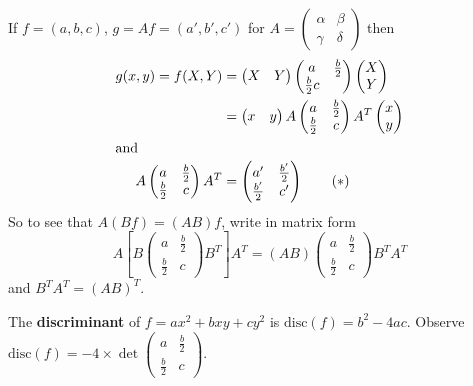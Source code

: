 \documentclass{article}
\begin{document}
\begin{remark}
    If $f = (a,b,c)$, $g = Af = (a',b',c')$ for $A = \begin{pmatrix} \alpha & \beta \\ \gamma & \delta \end{pmatrix}$ then
    \begin{align*}
    g(x,y) = f(X,Y) &= \begin{pmatrix}X & Y\end{pmatrix}\begin{pmatrix}a & \frac{b}{2} \\ \frac{b}{2} c \end{pmatrix}\begin{pmatrix}X \\ Y\end{pmatrix} \\
                    &= \begin{pmatrix}x & y\end{pmatrix}A\begin{pmatrix}a & \frac{b}{2} \\ \frac{b}{2} & c \end{pmatrix}A^T \begin{pmatrix}x \\ y\end{pmatrix} \\
        \shortintertext{and}
                    A\begin{pmatrix}a & \frac{b}{2} \\ \frac{b}{2} & c \end{pmatrix}A^T&= \begin{pmatrix} a' & \frac{b'}{2} \\ \frac{b'}{2} & c' \end{pmatrix} \label{eq:9star}\tag{$*$}
    \end{align*}
    So to see that $A(Bf) = (AB)f$, write in matrix form
    \begin{equation*}
    A[B \begin{pmatrix}a & \frac{b}{2}\\\frac{b}{2} & c\end{pmatrix} B^T]A^T = (AB) \begin{pmatrix}a & \frac{b}{2}\\\frac{b}{2} & c\end{pmatrix} B^T A^T
    \end{equation*}
    and $B^TA^T = (AB)^T$.

\end{remark}

\begin{defi}[Discriminant]
    The \textbf{discriminant} of $f = ax^2 + b x y + c y^2$ is $\mathrm{disc}(f) = b^2 - 4ac$.
    Observe $\mathrm{disc}(f) = -4 \times \det\begin{pmatrix}a & \frac{b}{2} \\ \frac{b}{2} & c\end{pmatrix}$.
\end{defi}
\end{document}
